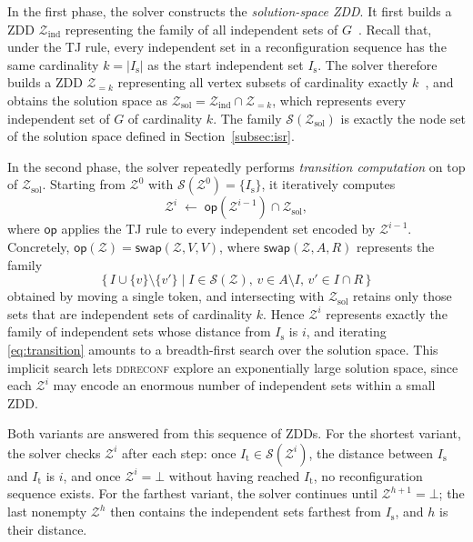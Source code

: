 \documentclass[conference]{IEEEtran}
\newcommand{\ini}{\mathrm{s}}
\newcommand{\tar}{\mathrm{t}}
\newcommand{\Z}{\mathcal{Z}}
\newcommand{\sets}{\mathcal{S}}
\newcommand{\zind}{\mathcal{Z}_{\mathrm{ind}}}
\newcommand{\zsol}{\mathcal{Z}_{\mathrm{sol}}}
\newcommand{\swap}{\mathsf{swap}}
\begin{document}
In the first phase, the solver constructs the \emph{solution-space ZDD}.
It first builds a ZDD $\zind$ representing the family of all independent sets of
$G$~\cite{Hayase1995}. Recall that, under the TJ rule, every independent set in a
reconfiguration sequence has the same cardinality $k = |I_\ini|$ as the start
independent set $I_\ini$. The solver therefore builds a ZDD $\Z_{=k}$
representing all vertex subsets of cardinality exactly $k$~\cite{knuth:taocp41},
and obtains the solution space as $\zsol = \zind \cap \Z_{=k}$, which represents
every independent set of $G$ of cardinality $k$. The family $\sets(\zsol)$ is
exactly the node set of the solution space defined in
Section~\ref{subsec:isr}.

In the second phase, the solver repeatedly performs \emph{transition
computation} on top of $\zsol$. Starting from $\Z^{0}$ with
$\sets(\Z^{0}) = \{I_\ini\}$, it iteratively computes
\begin{equation}
  \Z^{i} \;\gets\; \mathsf{op}(\Z^{i-1}) \cap \zsol,
  \label{eq:transition}
\end{equation}
where $\mathsf{op}$ applies the TJ rule to every independent set encoded by
$\Z^{i-1}$. Concretely, $\mathsf{op}(\Z) = \swap(\Z, V, V)$, where
$\swap(\Z, A, R)$ represents the family
\[
  \{\, I \cup \{v\} \setminus \{v'\} \mid I \in \sets(\Z),\,
  v \in A \setminus I,\, v' \in I \cap R \,\}
\]
obtained by moving a single token, and intersecting with $\zsol$ retains only
those sets that are independent sets of cardinality $k$. Hence $\Z^{i}$
represents exactly the family of independent sets whose distance from $I_\ini$ is
$i$, and iterating \eqref{eq:transition} amounts to a breadth-first search over
the solution space. This implicit search lets \textsc{ddreconf} explore an
exponentially large solution space, since each $\Z^{i}$ may encode an enormous
number of independent sets within a small ZDD.

Both variants are answered from this sequence of ZDDs. For the shortest variant,
the solver checks $\Z^{i}$ after each step: once $I_\tar \in \sets(\Z^{i})$, the
distance between $I_\ini$ and $I_\tar$ is $i$, and once $\Z^{i} = \bot$ without
having reached $I_\tar$, no reconfiguration sequence exists. For the farthest
variant, the solver continues until $\Z^{h+1} = \bot$; the last nonempty
$\Z^{h}$ then contains the independent sets farthest from $I_\ini$, and $h$ is
their distance.
\end{document}
